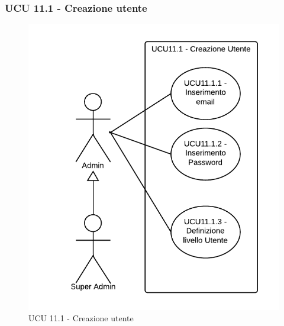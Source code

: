 \subsubsection{UCU 11.1 - Creazione utente}    
    \begin{figure}[H]
      \begin{center}
      \includegraphics[width=12cm]{UML/UCU 11.1 - Creazione utente.png}
      \caption{UCU 11.1 - Creazione utente}
      \end{center} 
    \end{figure}    
    
